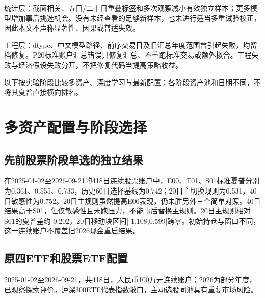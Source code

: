 \documentclass[12pt]{article}
\begin{document}
统计层：截面相关、五日/二十日重叠标签和多次观察减小有效独立样本；更多模型增加事后挑选机会。没有未经查看的足够新样本，也未进行适当多重试验校正，因此本文不声称显著性、因果或普适失效。

工程层：dtype、中文模型路径、前序交易日及旧汇总年度范围曾引起失败，均留档修复。P20标准账户汇总错误只修复汇总、不重跑标准交易或额外拟合。工程失败与经济假设失败分开，不把修复代码当提高策略收益。


以下按实验阶段比较多资产、深度学习与最新配置；各阶段资产池和日期不同，不将其夏普直接横向排名。

\section{多资产配置与阶段选择}
\subsection{先前股票阶段单选的独立结果}
在2025-01-02至2026-09-21的418日连续股票账户中，E00、T01、S01标准夏普分别为0.361、0.555、0.733，历史60日选择基线为0.742；20日主切换规则为0.531，40日敏感性为0.752。20日主规则虽然提高E00表现，仍未胜另外三个简单对照。40日结果高于S01，但仅敏感性且未跑压力，不能事后替换主规则。20日主规则相对S01的夏普差约-0.202，20日移动块区间[-1.108,0.599]跨零。初始持仓与窗口不同，这一连续账户不覆盖旧2026现金重启结果。

\subsection{原四ETF和股票ETF配置}

2025-01-02至2026-09-21，共418日，人民币100万元连续账户；2026为部分年度，已观察探索评价。沪深300ETF代表指数敞口，主动选股同池具有重复市场风险。
\end{document}
